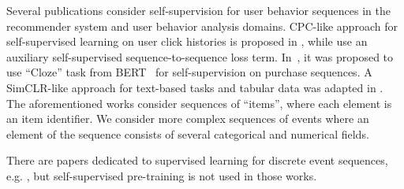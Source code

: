 \documentclass[sigconf, anonymous]{acmart}
\newcommand{\attn}[1]{{\color{cyan}{\textbf{#1}}}}
\begin{document}


Several publications consider self-supervision for user behavior sequences in the recommender system
and user behavior analysis domains. CPC-like approach for self-supervised learning on user click
histories is proposed in \citep{Zhou2020ContrastiveLF}, while \citep{Ma2020DisentangledSI} use
an auxiliary self-supervised sequence-to-sequence loss term.
%
In~\citep{Zhou2020S3RecSL}, it was proposed to use ``Cloze'' task from BERT~\citep{Devlin2019BERTPO}
for self-supervision on purchase sequences.
A SimCLR-like approach for text-based tasks and tabular data was adapted in \citep{Yao2020SelfsupervisedLF}.
The aforementioned works consider sequences of ``items'', where each element is an item identifier.
We consider more complex sequences of events where an element of the sequence consists of several
categorical and numerical fields.

There are papers dedicated to supervised learning for discrete event sequences, e.g. \citep{Wiese2009CreditCT,Tobback2019RetailCS,Babaev2019ETRNNAD,chatterjee2003modeling,sinha2014your},
but self-supervised pre-training is not used in those works.
\end{document}
